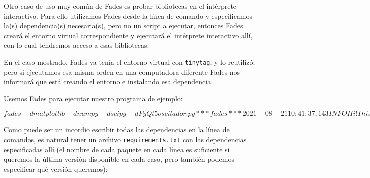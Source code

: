Otro caso de uso muy común de Fades es probar bibliotecas en el intérprete interactivo. Para ello utilizamos Fades desde la línea de comando y especificamos la(s) dependencia(s) necesaria(s), pero no un script a ejecutar, entonces Fades creará el entorno virtual correspondiente y ejecutará el intérprete interactivo allí, con lo cual tendremos acceso a esas bibliotecas:


En el caso mostrado, Fades ya tenía el entorno virtual con \texttt{tinytag}, y lo reutilizó, pero si ejecutamos esa misma orden en una computadora diferente Fades nos informará que está creando el entorno e instalando esa dependencia.

Usemos Fades para ejecutar nuestro programa de ejemplo:

\begin{shell}
    [/temp]$ fades -d matplotlib -d numpy -d scipy -d PyQt5 oscilador.py
        *** fades ***  2021-08-21 10:41:37,143  INFO     Hi! This is fades 9.0.1, automatically managing your dependencies
        *** fades ***  2021-08-21 10:41:37,143  INFO     Checking the availabilty of dependencies in PyPI. You can use '--no-precheck-availability' to avoid it.
        *** fades ***  2021-08-21 10:41:41,115  INFO     Installing dependency: 'PyQt5'
        *** fades ***  2021-08-21 10:41:44,816  INFO     Installing dependency: 'numpy'
        *** fades ***  2021-08-21 10:41:47,650  INFO     Installing dependency: 'scipy'
        *** fades ***  2021-08-21 10:41:51,216  INFO     Installing dependency: 'matplotlib'
        Opciones del script: Namespace(archivo=None, usar_tex=False)
        Ejecutando con parámetros: a=17 b=1 λ=15.4 µ=0.75
        Config de matplotlib: {'font.size': 14, 'axes.labelsize': 'large'}
        [/temp]$
\end{shell}

Como puede ser un incordio escribir todas las dependencias en la línea de comandos, es natural tener un archivo \texttt{requirements.txt} con las dependencias especificadas allí (el nombre de cada paquete en cada línea es suficiente si queremos la última versión disponible en cada caso, pero también podemos especificar qué versión queremos):


